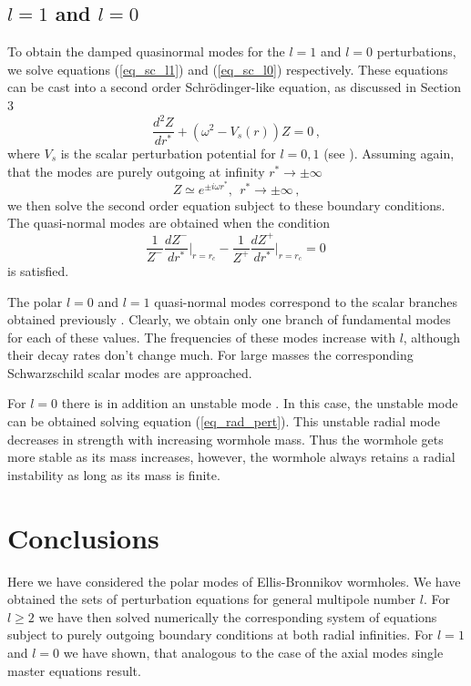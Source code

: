 \documentclass[a4paper,12pt]{article}
\newcommand{\be}{\begin{equation}}
\newcommand{\ee}{\end{equation}}
\begin{document}
\subsection{$l=1$ and $l=0$}

To obtain the damped quasinormal modes for the $l=1$ and $l=0$ perturbations, we solve equations (\ref{eq_sc_l1}) and (\ref{eq_sc_l0}) respectively.
These equations can be cast into a second order Schr\"odinger-like equation, as discussed in Section 3
    \be   
    \frac{d^2Z}{dr^*}+\left(\omega^2-V_s(r)\right)Z=0 \,,
    \ee
where $V_s$ is the scalar perturbation potential for $l=0,1$ (see \cite{Blazquez-Salcedo:2018ipc}).
Assuming again, that the modes are purely outgoing at infinity $r^* \to \pm\infty$
    \be
    Z \simeq e^{\pm i\omega r^*},\  \  r^* \to \pm \infty \,,
     \ee 
we then solve the second order equation subject to these boundary conditions. 
The quasi-normal modes are obtained when the condition
\begin{equation}
 \frac{1}{Z^-} \frac{d Z^-}{d r^{*}}  \bigg|_{r=r_c} - \frac{1}{Z^+} \frac{d Z^+}{d r^{*}}  \bigg|_{r=r_c}  =0 \,
\end{equation}
is satisfied.


The polar $l=0$ and $l=1$ quasi-normal modes correspond to the scalar branches obtained previously \cite{Blazquez-Salcedo:2018ipc}.
Clearly, we obtain only one branch of fundamental modes for each of these values.
The frequencies of these modes increase with $l$, although their decay rates don't change much. 
For large masses the corresponding Schwarzschild scalar modes are approached.

For $l=0$ 
there is in addition an unstable mode 
\cite{Shinkai:2002gv,Gonzalez:2008wd,Gonzalez:2008xk,Cremona:2018wkj,Blazquez-Salcedo:2018ipc}.
In this case, the unstable mode can be obtained solving equation (\ref{eq_rad_pert}).
This unstable radial mode decreases in strength with increasing wormhole mass.
Thus the wormhole gets more stable as its mass increases, however, the wormhole always retains a radial instability as long as its mass is finite.






\section{Conclusions}

Here we have considered the polar modes of Ellis-Bronnikov wormholes.
We have obtained the sets of perturbation equations for general multipole number $l$. 
For $l\ge 2$ we have then solved numerically the corresponding  system of equations subject to purely outgoing boundary conditions at both radial infinities.
For $l=1$ and $l=0$ we have shown, that analogous to the case of the axial modes single master equations result.
\end{document}
